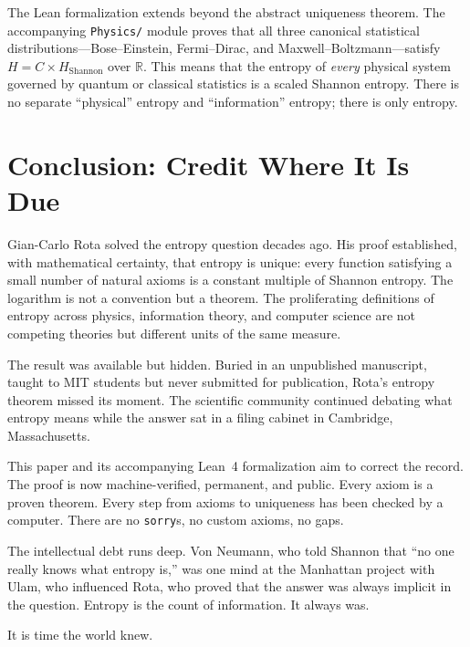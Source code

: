 \documentclass[12pt,a4paper]{article}
\theoremstyle{definition}
\newcommand{\lean}[1]{\texttt{#1}}
\begin{document}
The Lean formalization extends beyond the abstract uniqueness theorem.
The accompanying \lean{Physics/} module proves that all three canonical
statistical distributions---Bose--Einstein, Fermi--Dirac, and
Maxwell--Boltzmann---satisfy $H = C \times H_{\mathrm{Shannon}}$ over
$\mathbb{R}$.  This means that the entropy of \emph{every} physical
system governed by quantum or classical statistics is a scaled Shannon
entropy.  There is no separate ``physical'' entropy and ``information''
entropy; there is only entropy.

\section{Conclusion: Credit Where It Is Due}
\label{sec:conclusion}

Gian-Carlo Rota solved the entropy question decades ago.  His proof
established, with mathematical certainty, that entropy is unique: every
function satisfying a small number of natural axioms is a constant
multiple of Shannon entropy.  The logarithm is not a convention but a
theorem.  The proliferating definitions of entropy across
physics, information theory, and computer science are not competing
theories but different units of the same measure.

The result was available but hidden.  Buried in an unpublished
manuscript, taught to MIT students but never submitted for publication,
Rota's entropy theorem missed its moment.  The scientific community
continued debating what entropy means while the answer sat in a filing
cabinet in Cambridge, Massachusetts.

This paper and its accompanying Lean~4 formalization aim to correct the
record.  The proof is now machine-verified, permanent, and public.
Every axiom is a proven theorem.  Every step from axioms to uniqueness
has been checked by a computer.  There are no \lean{sorry}s, no custom
axioms, no gaps.

The intellectual debt runs deep.  Von Neumann, who told Shannon that
``no one really knows what entropy is,'' was one mind at the Manhattan project with Ulam, who influenced
Rota, who proved that the answer was always implicit in the question.
Entropy is the count of information.  It always was.

It is time the world knew.

\end{document}
